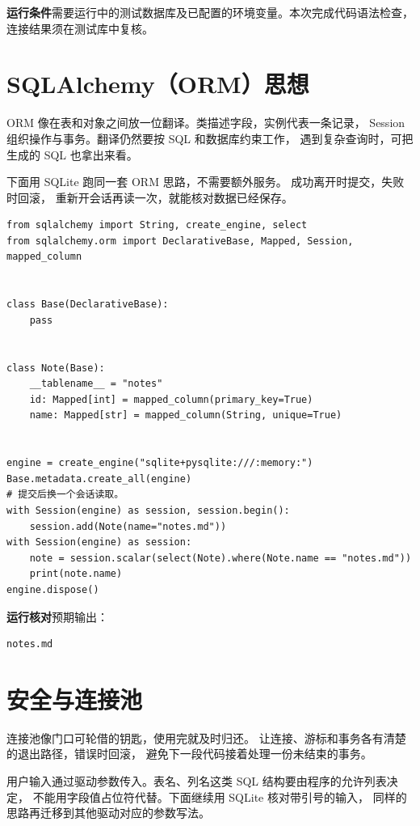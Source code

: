 \documentclass[UTF8,a4paper,oneside,openany,fontset=none,11pt]{ctexbook}
\newcommand{\code}[1]{\texttt{\detokenize{#1}}}
\begin{document}
\textbf{运行条件}\enspace 需要运行中的测试数据库及已配置的环境变量。本次完成代码语法检查，连接结果须在测试库中复核。


\section[SQLAlchemy思想]{SQLAlchemy（ORM）思想}

ORM 像在表和对象之间放一位翻译。类描述字段，实例代表一条记录，
Session 组织操作与事务。翻译仍然要按 SQL 和数据库约束工作，
遇到复杂查询时，可把生成的 SQL 也拿出来看。

下面用 SQLite 跑同一套 ORM 思路，不需要额外服务。
\code{Session.begin()} 成功离开时提交，失败时回滚，
重新开会话再读一次，就能核对数据已经保存。


\begin{lstlisting}[title={\code{orm_note.py}}]
from sqlalchemy import String, create_engine, select
from sqlalchemy.orm import DeclarativeBase, Mapped, Session, mapped_column


class Base(DeclarativeBase):
    pass


class Note(Base):
    __tablename__ = "notes"
    id: Mapped[int] = mapped_column(primary_key=True)
    name: Mapped[str] = mapped_column(String, unique=True)


engine = create_engine("sqlite+pysqlite:///:memory:")
Base.metadata.create_all(engine)
# 提交后换一个会话读取。
with Session(engine) as session, session.begin():
    session.add(Note(name="notes.md"))
with Session(engine) as session:
    note = session.scalar(select(Note).where(Note.name == "notes.md"))
    print(note.name)
engine.dispose()
\end{lstlisting}


\textbf{运行核对}\enspace 预期输出：
\begin{lstlisting}[language={},numbers=none]
notes.md
\end{lstlisting}

\par


\section{安全与连接池}

连接池像门口可轮借的钥匙，使用完就及时归还。
让连接、游标和事务各有清楚的退出路径，错误时回滚，
避免下一段代码接着处理一份未结束的事务。

用户输入通过驱动参数传入。表名、列名这类 SQL 结构要由程序的允许列表决定，
不能用字段值占位符代替。下面继续用 SQLite 核对带引号的输入，
同样的思路再迁移到其他驱动对应的参数写法。
\end{document}
